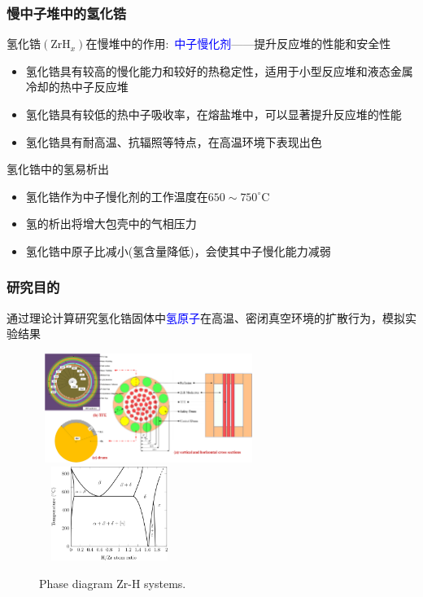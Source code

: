 \begin{frame}
	\frametitle{慢中子堆中的氢化锆}
	氢化锆$(\mathrm{ZrH}_x)$在慢堆中的作用:~\textcolor{blue}{中子慢化剂}——提升反应堆的性能和安全性
	\begin{itemize}
		\item 氢化锆具有较高的慢化能力和较好的热稳定性，适用于小型反应堆和液态金属冷却的热中子反应堆
		\item 氢化锆具有较低的热中子吸收率，在熔盐堆中，可以显著提升反应堆的性能
		\item 氢化锆具有耐高温、抗辐照等特点，在高温环境下表现出色
	\end{itemize}
氢化锆中的氢易析出
\begin{itemize}
	\item 氢化锆作为中子慢化剂的工作温度在$650\sim750^{\circ}\mathrm{C}$
	\item 氢的析出将增大包壳中的气相压力
	\item 氢化锆中原子比减小(氢含量降低)，会使其中子慢化能力减弱
\end{itemize}
\end{frame}
\begin{frame}
	\frametitle{研究目的}
	通过理论计算研究氢化锆固体中\textcolor{blue}{氢原子}在高温、密闭真空环境的扩散行为，模拟实验结果
\begin{figure}[!ht]
\centering
\vspace*{-0.05in}
\includegraphics[height=1.40in,width=2.80in,viewport=0 0 450 240,clip]{Figures/Schematic_diagram_of_Topaz-II_reactor.jpeg}
\includegraphics[height=1.20in,width=1.80in,viewport=0 0 930 748,clip]{Figures/Phase_diagram-Zr_H-systems.png}
\caption{\tiny \textrm{Phase diagram Zr-H systems.}}
\label{Fig:Phase_diagram-Zr_H-systems}
\end{figure}
\end{frame}

